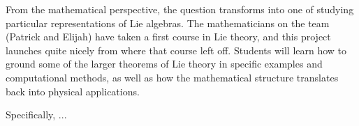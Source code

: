 \documentclass[11pt, reqno]{amsart}
\begin{document}
From the mathematical perspective, the question transforms into one of studying particular representations of Lie algebras. The mathematicians on the team (Patrick and Elijah) have taken a first course in Lie theory, and this project launches quite nicely from where that course left off. Students will learn how to ground some of the larger theorems of Lie theory in specific examples and computational methods, as well as how the mathematical structure translates back into physical applications. 

Specifically, ...

\printbibliography
\end{document}
